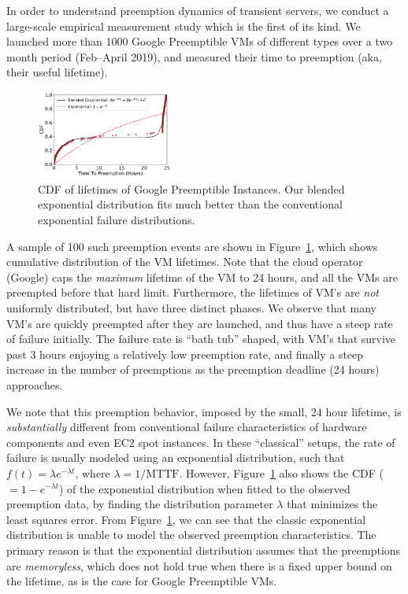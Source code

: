 In order to understand preemption dynamics of transient servers, we conduct a large-scale empirical measurement study which is the first of its kind. 
We launched more than 1000 Google Preemptible VMs of different types over a two month period (Feb--April 2019), and measured their time to preemption (aka, their useful lifetime).\footnotemark



\begin{figure}
  \centering
  \includegraphics[width=0.4\textwidth]{../data/cdf_all.pdf}
  \caption{CDF of lifetimes of Google Preemptible Instances. Our blended exponential distribution fits much better than the conventional exponential failure distributions. }
  \label{fig:gcp1}
\end{figure}


A sample of 100 such preemption events are shown in Figure~\ref{fig:gcp1}, which shows cumulative distribution of the VM lifetimes. 
Note that the cloud operator (Google) caps the \emph{maximum} lifetime of the VM to 24 hours, and all the VMs are preempted before that hard limit.
Furthermore, the lifetimes of VM's are \emph{not} uniformly distributed, but have three distinct phases. 
We observe that many VM's are quickly preempted after they are launched, and thus have a steep rate of failure initially.
The failure rate is ``bath tub'' shaped, with VM's that survive past 3 hours enjoying a relatively low preemption rate, and finally a steep increase in the number of preemptions as the preemption deadline (24 hours) approaches. 


We note that this preemption behavior, imposed by the small, 24 hour  lifetime, is \emph{substantially} different from conventional failure characteristics of hardware components and even EC2 spot instances.
In these ``classical'' setups, the rate of failure is usually modeled using an exponential distribution, such that $f(t) = \lambda e^{-\lambda t}$, where $\lambda=1/\text{MTTF}$.
However, Figure~\ref{fig:gcp1} also shows the CDF ($=1-e^{-\lambda t}$) of the exponential distribution when fitted to the observed preemption data, by finding the distribution parameter $\lambda$ that minimizes the least squares error.
From Figure~\ref{fig:gcp1}, we can see that the classic exponential distribution is unable to model the observed preemption characteristics.
The primary reason is that the exponential distribution assumes that the preemptions are \emph{memoryless}, which does not hold true when there is a fixed upper bound on the lifetime, as is the case for Google Preemptible VMs.

